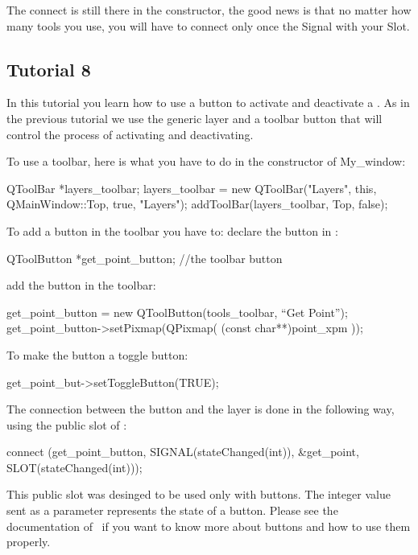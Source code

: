 The connect is still there in the constructor, the good news is that
no matter how many tools you use, you will have to connect only once
the {\sc Signal} with your {\sc Slot}.

\subsection*{Tutorial 8}

In this tutorial you learn how to use a button to activate and
deactivate a . As in the previous tutorial
we use the generic layer  and a
toolbar button that will control the process of activating and deactivating.

To use a toolbar, here is what you have to do in the constructor of My\_window:
\begin{ccExampleCode}
QToolBar  *layers_toolbar;
layers_toolbar = new QToolBar("Layers", this, QMainWindow::Top, true, "Layers");
addToolBar(layers_toolbar, Top, false);
\end{ccExampleCode}
To add a button in the toolbar you have to:
declare the button in :
\begin{ccExampleCode}
QToolButton *get_point_button;     //the toolbar button
\end{ccExampleCode}
add the button in the toolbar:
\begin{ccExampleCode}
get_point_button = new QToolButton(tools_toolbar, ``Get Point'');
get_point_button->setPixmap(QPixmap( (const char**)point_xpm ));
\end{ccExampleCode}
To make the button a toggle button:
\begin{ccExampleCode}
get_point_but->setToggleButton(TRUE);
\end{ccExampleCode}
The connection between the button and the layer is done in the
following way, using the  public slot of :
\begin{ccExampleCode}
connect (get_point_button, SIGNAL(stateChanged(int)),
         &get_point, SLOT(stateChanged(int)));
\end{ccExampleCode}
\begin{ccAdvanced}
This public slot was desinged to be used only with \qt\/ buttons. The
integer value sent as a parameter represents the state of a \qt\/
button. Please see the documentation of \qt\ if you want to know more
about buttons and how to use them properly.
\end{ccAdvanced}
